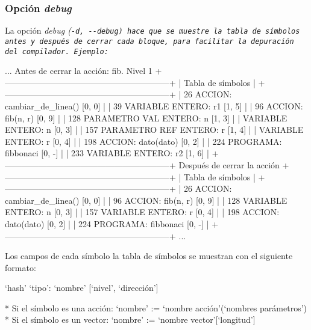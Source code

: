 \subsubsection{Opción \it{debug}}

La opción \it{debug} (\tt{-d}, \tt{-{}-debug}) hace que se muestre la tabla de símbolos antes y después de cerrar cada bloque, para facilitar la depuración del compilador. Ejemplo:

\begin{codigo}
    ...
Antes de cerrar la acción: fib. Nivel 1
+-----------------------------------------------------------+
| Tabla de símbolos                                                |
+-----------------------------------------------------------+
|    26  ACCION:                   cambiar_de_linea() [0, 0]       |
|    39  VARIABLE ENTERO:          r1 [1, 5]                       |
|    96  ACCION:                   fib(n, r) [0, 9]                |
|   128  PARAMETRO VAL ENTERO:     n [1, 3]                        |
|        VARIABLE ENTERO:          n [0, 3]                        |
|   157  PARAMETRO REF ENTERO:     r [1, 4]                        |
|        VARIABLE ENTERO:          r [0, 4]                        |
|   198  ACCION:                   dato(dato) [0, 2]               |
|   224  PROGRAMA:                 fibbonaci [0, -]                |
|   233  VARIABLE ENTERO:          r2 [1, 6]                       |
+-----------------------------------------------------------+
Después de cerrar la acción
+-----------------------------------------------------------+
| Tabla de símbolos                                                |
+-----------------------------------------------------------+
|    26  ACCION:                   cambiar_de_linea() [0, 0]       |
|    96  ACCION:                   fib(n, r) [0, 9]                |
|   128  VARIABLE ENTERO:          n [0, 3]                        |
|   157  VARIABLE ENTERO:          r [0, 4]                        |
|   198  ACCION:                   dato(dato) [0, 2]               |
|   224  PROGRAMA:                 fibbonaci [0, -]                |
+-----------------------------------------------------------+
    ...
\end{codigo}

Los campos de cada símbolo la tabla de símbolos se muestran con el siguiente formato:

\begin{codigo}
`hash' `tipo':     `nombre' [`nivel', `dirección']

* Si el símbolo es una acción:
      `nombre' := `nombre acción'(`nombres parámetros')
* Si el símbolo es un vector:
      `nombre' := `nombre vector'[`longitud']
\end{codigo}

